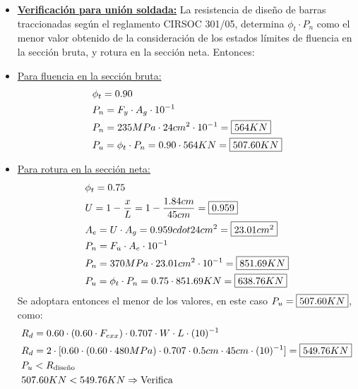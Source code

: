 \begin{enumerate}
\begin{itemize}
\item \underline{\textbf{Verificación para unión soldada:}}
La resistencia de diseño de barras traccionadas según el reglamento CIRSOC 301/05, determina $\phi_t \cdot P_n$ como el menor valor obtenido de la consideración de los estados límites de fluencia en la sección bruta, y rotura en la sección neta. Entonces:\\
\item \underline{Para fluencia en la sección bruta:}
\begin{align*}
& \phi_t = 0.90 \\
& P_n = F_y \cdot A_g \cdot 10^{-1} \\
& P_n = 235MPa \cdot 24cm^2 \cdot 10^{-1} = \framebox{$564KN$}\\
& P_u = \phi_t \cdot P_n = 0.90 \cdot 564KN = \framebox{$507.60KN$}
\end{align*}

\item \underline{Para rotura en la sección neta:}
\begin{align*}
& \phi_t = 0.75 \\
& U = 1 - \frac{x}{L} = 1 - \frac{1.84cm}{45cm} = \framebox{$0.959$} \\
& A_e = U \cdot A_g = 0.959 cdot 24cm^2 = \framebox{$23.01cm^2$} \\
& P_n = F_u \cdot A_e \cdot 10^{-1} \\
& P_n = 370MPa \cdot 23.01cm^2 \cdot 10^{-1} = \framebox{$851.69KN$}\\
& P_u = \phi_t \cdot P_n = 0.75 \cdot 851.69KN = \framebox{$638.76KN$}
\end{align*}
Se adoptara entonces el menor de los valores, en este caso $P_u = \framebox{$507.60KN$}$, como:
\begin{align*}
& R_d = 0.60 \cdot (0.60 \cdot F_{exx}) \cdot 0.707 \cdot W \cdot L \cdot (10)^{-1} \\
& R_d = 2 \cdot [0.60 \cdot (0.60 \cdot 480MPa) \cdot 0.707 \cdot 0.5cm \cdot 45cm \cdot (10)^{-1}] = \framebox{$549.76KN$}\\
& P_u < R_{\text{diseño}} \\
& 507.60KN < 549.76KN \Rightarrow \text{Verifica}
\end{align*}

\end{itemize}
\end{enumerate}